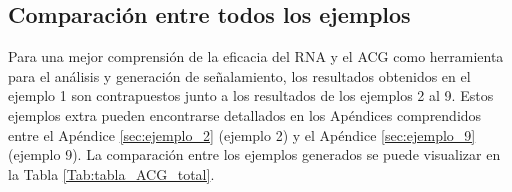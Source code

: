 \subsection{Comparación entre todos los ejemplos}

	Para una mejor comprensión de la eficacia del RNA y el ACG como herramienta para el análisis y generación de señalamiento, los resultados obtenidos en el ejemplo 1 son contrapuestos junto a los resultados de los ejemplos 2 al 9. Estos ejemplos extra pueden encontrarse detallados en los Apéndices comprendidos entre el Apéndice \ref{sec:ejemplo_2} (ejemplo 2) y el Apéndice \ref{sec:ejemplo_9} (ejemplo 9). La comparación entre los ejemplos generados se puede visualizar en la Tabla \ref{Tab:tabla_ACG_total}.

	\begin{table}[H]
		{
			\caption{Comparación entre los ejemplos generados por el ACG.}
			\label{Tab:tabla_ACG_total}
			\centering
			\begin{center}
\end{center}}
\end{table}
